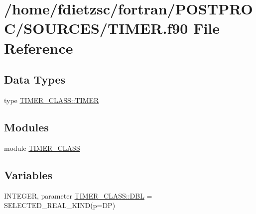 \hypertarget{TIMER_8f90}{
\section{/home/fdietzsc/fortran/POSTPROC/SOURCES/TIMER.f90 File Reference}
\label{TIMER_8f90}
}
\subsection*{Data Types}
\begin{DoxyCompactItemize}
\item 
type \hyperlink{typeTIMER__CLASS_1_1TIMER}{TIMER\_\-CLASS::TIMER}
\end{DoxyCompactItemize}
\subsection*{Modules}
\begin{DoxyCompactItemize}
\item 
module \hyperlink{namespaceTIMER__CLASS}{TIMER\_\-CLASS}
\end{DoxyCompactItemize}
\subsection*{Variables}
\begin{DoxyCompactItemize}
\item 
INTEGER, parameter \hyperlink{namespaceTIMER__CLASS_aad0658ec4217d15cb973a454db271c59}{TIMER\_\-CLASS::DBL} = SELECTED\_\-REAL\_\-KIND(p=DP)
\end{DoxyCompactItemize}
